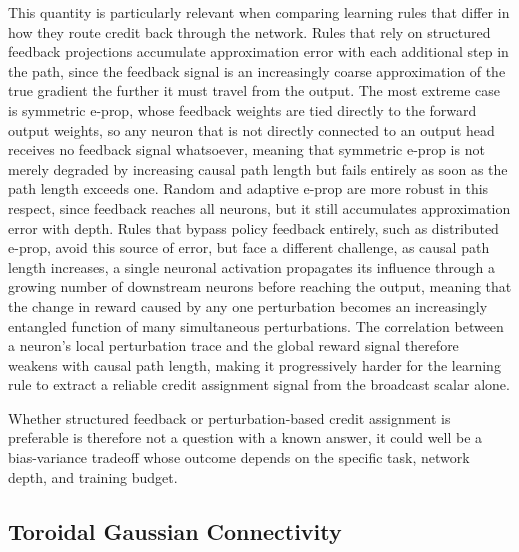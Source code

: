 This quantity is particularly relevant when comparing learning rules that
differ in how they route credit back through the network. Rules that rely on
structured feedback projections accumulate approximation error with each
additional step in the path, since the feedback signal is an increasingly
coarse approximation of the true gradient the further it must travel from
the output. The most extreme case is symmetric e-prop, whose feedback weights
are tied directly to the forward output weights, so any neuron that is not
directly connected to an output head receives no feedback signal whatsoever,
meaning that symmetric e-prop is not merely degraded by increasing causal
path length but fails entirely as soon as the path length exceeds one.
Random and adaptive e-prop are more robust in this respect, since feedback reaches all neurons, but it still accumulates approximation error with depth. Rules that
bypass policy feedback entirely, such as distributed e-prop, avoid this source of
error, but face a different challenge, as causal path length increases, a
single neuronal activation propagates its influence through a growing number
of downstream neurons before reaching the output, meaning that the change in
reward caused by any one perturbation becomes an increasingly entangled
function of many simultaneous perturbations. The correlation between a
neuron's local perturbation trace and the global reward signal therefore
weakens with causal path length, making it progressively harder for the
learning rule to extract a reliable credit assignment signal from the
broadcast scalar alone.

Whether structured feedback or perturbation-based credit assignment is
preferable is therefore not a question with a known answer, it could well be 
a bias-variance tradeoff whose outcome depends on the specific task,
network depth, and training budget.

\subsection{Toroidal Gaussian Connectivity}
\label{sec:toroidal}

